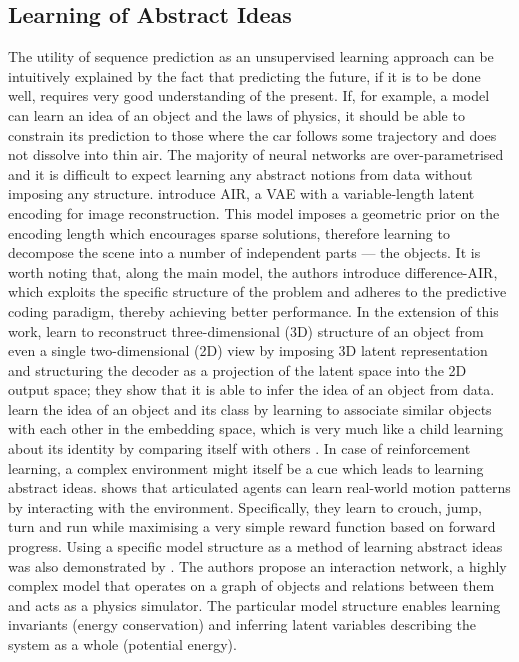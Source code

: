     \subsection{Learning of Abstract Ideas}
        The utility of sequence prediction as an unsupervised learning approach can be intuitively explained by the fact that predicting the future, if it is to be done well, requires very good understanding of the present. If, for example, a model can learn an idea of an object and the laws of physics, it should be able to constrain its prediction to those where the car follows some trajectory and does not dissolve into thin air. The majority of neural networks are over-parametrised \citep{Denil2013} and it is difficult to expect learning any abstract notions from data without imposing any structure. \cite{Eslami2016} introduce AIR, a VAE with a variable-length latent encoding for image reconstruction. This model imposes a geometric prior on the encoding length which encourages sparse solutions, therefore learning to decompose the scene into a number of independent parts --- the objects. It is worth noting that, along the main model, the authors introduce difference-AIR, which exploits the specific structure of the problem and adheres to the predictive coding paradigm, thereby achieving better performance. In the extension of this work, \cite{Rezende2016} learn to reconstruct three-dimensional (3D) structure of an object from even a single two-dimensional (2D) view by imposing 3D latent representation and structuring the decoder as a projection of the latent space into the 2D output space; they show that it is able to infer the idea of an object from data.
        \cite{Haeusser2017} learn the idea of an object and its class by learning to associate similar objects with each other in the embedding space, which is very much like a child learning about its identity by comparing itself with others \citep{Decety2003}.
        In case of reinforcement learning, a complex environment might itself be a cue which leads to learning abstract ideas. \cite{Heess2017} shows that articulated agents can learn real-world motion patterns by interacting with the environment. Specifically, they learn to crouch, jump, turn and run while maximising a very simple reward function based on forward progress.
        Using a specific model structure as a method of learning abstract ideas was also demonstrated by \cite{Battaglia2016}. The authors propose an interaction network, a highly complex model that operates on a graph of objects and relations between them and acts as a physics simulator. The particular model structure enables learning invariants (\eg energy conservation) and inferring latent variables describing the system as a whole (\eg potential energy).
        

